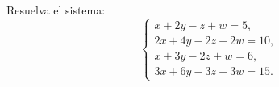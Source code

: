 \begin{ejercicio}
Resuelva el sistema:
\[
\begin{cases}
x + 2y - z + w = 5,\\
2x + 4y - 2z + 2w = 10,\\
x + 3y - 2z + w = 6,\\
3x + 6y - 3z + 3w = 15.
\end{cases}
\]
\end{ejercicio}
